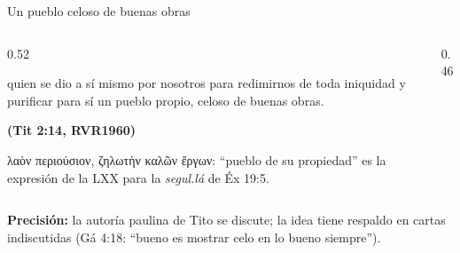 \documentclass[hyperref={bookmarks=false},aspectratio=169]{beamer}
\newcommand{\grc}[1]{\foreignlanguage{ancientgreek}{#1}}
\newcommand{\fuente}[1]{\par\hfill{\upshape\bfseries\footnotesize\textcolor{azul}{#1}}}
\newcommand{\precision}[1]{{\footnotesize\color{gris}\textbf{Precisión:} #1}}
\begin{document}
\begin{frame}{Un pueblo celoso de buenas obras}
\begin{columns}[c,onlytextwidth]
\begin{column}{0.52\textwidth}
\begin{cita}quien se dio a sí mismo por nosotros para redimirnos de toda iniquidad y purificar para sí un pueblo propio, celoso de buenas obras.\fuente{(Tit 2:14, RVR1960)}\end{cita}
\scriptsize\grc{λαὸν περιούσιον, ζηλωτὴν καλῶν ἔργων}: ``pueblo de su propiedad'' es la expresión de la LXX para la \emph{segul.lá} de Éx 19:5.
\end{column}
\begin{column}{0.46\textwidth}
\centering
{}
\end{column}
\end{columns}\par\smallskip
\precision{la autoría paulina de Tito se discute; la idea tiene respaldo en cartas indiscutidas (Gá 4:18: ``bueno es mostrar celo en lo bueno siempre'').}
\end{frame}
\end{document}
